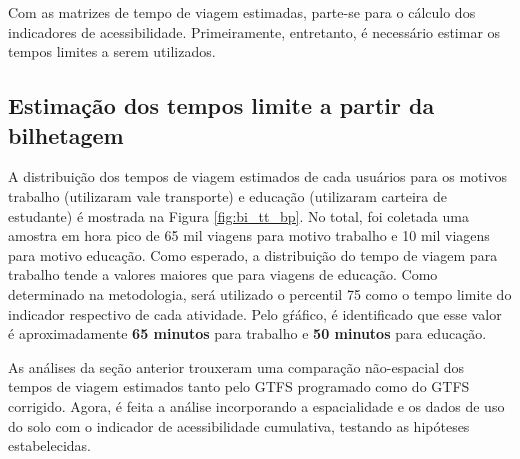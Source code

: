 \documentclass[        
    a4paper,          %
    12pt,             %
    chapter=TITLE,    %
    section=Title,    %
    subsection=Title, %
    oneside,          %
    english,          %
    spanish,          %
    brazil,           %
    fleqn             %
]{abntex2}
\begin{document}
  Com as matrizes de tempo de viagem estimadas, parte-se para o cálculo dos indicadores de acessibilidade. Primeiramente, entretanto, é necessário estimar os tempos limites a serem utilizados.
  
  \hypertarget{estimacao-dos-tempos-limite-a-partir-da-bilhetagem}{%
  \subsection{Estimação dos tempos limite a partir da bilhetagem}\label{estimacao-dos-tempos-limite-a-partir-da-bilhetagem}}
  
  A distribuição dos tempos de viagem estimados de cada usuários para os motivos trabalho (utilizaram vale transporte) e educação (utilizaram carteira de estudante) é mostrada na Figura \ref{fig:bi_tt_bp}. No total, foi coletada uma amostra em hora pico de 65 mil viagens para motivo trabalho e 10 mil viagens para motivo educação. Como esperado, a distribuição do tempo de viagem para trabalho tende a valores maiores que para viagens de educação. Como determinado na metodologia, será utilizado o percentil 75 como o tempo limite do indicador respectivo de cada atividade. Pelo gŕáfico, é identificado que esse valor é aproximadamente \textbf{65 minutos} para trabalho e \textbf{50 minutos} para educação.
  
  \begin{figure}[!h]
  \captionsetup{width=16cm}
  \centering
  \end{figure}
  
  As análises da seção anterior trouxeram uma comparação não-espacial dos tempos de viagem estimados tanto pelo GTFS programado como do GTFS corrigido. Agora, é feita a análise incorporando a espacialidade e os dados de uso do solo com o indicador de acessibilidade cumulativa, testando as hipóteses estabelecidas.
  
\end{document}
